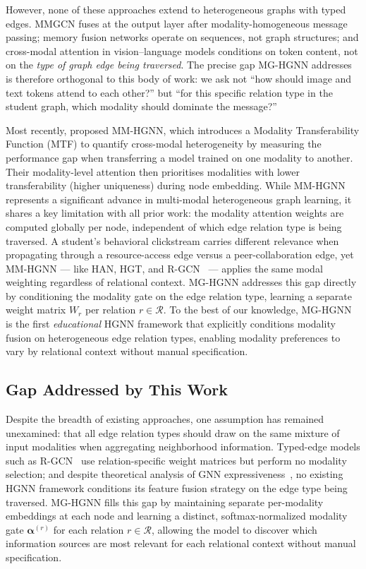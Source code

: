 \documentclass[sigconf,review]{acmart}
\begin{document}
However, none of these approaches extend to
heterogeneous graphs with typed edges. MMGCN fuses at
the output layer after modality-homogeneous message
passing; memory fusion networks operate on sequences,
not graph structures; and cross-modal attention in
vision--language models conditions on token content,
not on the \emph{type of graph edge being traversed}.
The precise gap MG-HGNN addresses is therefore
orthogonal to this body of work: we ask not ``how
should image and text tokens attend to each other?''
but ``for this specific relation type in the student
graph, which modality should dominate the message?''

Most recently, \citet{bachiri2025mmhgnn} proposed
MM-HGNN, which introduces a Modality Transferability
Function (MTF) to quantify cross-modal heterogeneity
by measuring the performance gap when transferring a
model trained on one modality to another. Their
modality-level attention then prioritises modalities
with lower transferability (higher uniqueness) during
node embedding. While MM-HGNN represents a significant
advance in multi-modal heterogeneous graph learning, it
shares a key limitation with all prior work: the
modality attention weights are computed globally per
node, independent of which edge relation type is being
traversed. A student's behavioral clickstream carries
different relevance when propagating through a
resource-access edge versus a peer-collaboration edge,
yet MM-HGNN --- like HAN, HGT, and
R-GCN~\citep{schlichtkrull2018modeling} --- applies the
same modal weighting regardless of relational context.
MG-HGNN addresses this gap directly by conditioning
the modality gate on the edge relation type, learning
a separate weight matrix $W_r$ per relation $r
\in \mathcal{R}$. To the best of our knowledge,
MG-HGNN is the first \emph{educational} HGNN framework
that explicitly conditions modality fusion on
heterogeneous edge relation types, enabling modality
preferences to vary by relational context without
manual specification.

\subsection{Gap Addressed by This Work}

Despite the breadth of existing approaches, one assumption has remained
unexamined: that all edge relation types should draw on the same mixture of
input modalities when aggregating neighborhood information. Typed-edge models such as
R-GCN~\citep{schlichtkrull2018modeling} use
relation-specific weight matrices but perform no
modality selection; and despite theoretical analysis
of GNN expressiveness~\citep{xu2019powerful}, no
existing HGNN framework conditions its feature
fusion strategy on the edge type being traversed.
MG-HGNN fills this gap by maintaining separate per-modality
embeddings at each node and learning a distinct, softmax-normalized modality
gate $\boldsymbol{\alpha}^{(r)}$ for each relation $r \in \mathcal{R}$,
allowing the model to discover which information sources are most relevant
for each relational context without manual specification.
\end{document}

